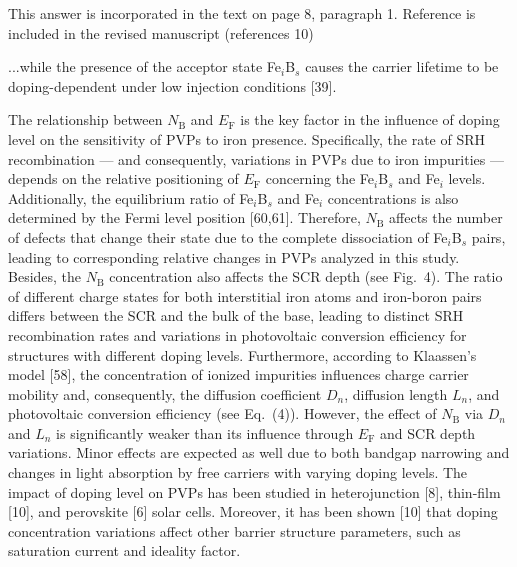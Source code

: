 \documentclass[a4paper,fleqn]{cas-sc}
\begin{document}
This answer is incorporated in the text on page 8, paragraph 1.
Reference  is included in the revised manuscript (references 10)







\begin{mdframed}
...while the presence of the acceptor state Fe$_i$B$_s$ causes the
carrier lifetime to be doping-dependent under low injection conditions [39].

\textcolor[rgb]{1.00,0.07,0.00}{
The relationship between $N_\mathrm{B}$ and $E_\mathrm{F}$ is the key  factor
in the influence of doping level on the sensitivity of PVPs to iron presence.
Specifically, the rate of SRH recombination ---
and consequently, variations in PVPs due to iron impurities ---
depends on the relative positioning of $E_\mathrm{F}$ concerning the Fe$_i$B$_s$ and Fe$_i$ levels.
Additionally, the equilibrium ratio of Fe$_i$B$_s$ and Fe$_i$ concentrations is also determined by the Fermi level position [60,61].
Therefore, $N_\mathrm{B}$ affects the number of defects that change their state due to the complete dissociation of Fe$_i$B$_s$ pairs,
leading to corresponding relative changes in PVPs analyzed in this study.
Besides, the $N_\mathrm{B}$ concentration also affects the SCR depth (see Fig.~4).
The ratio of different charge states for both interstitial iron atoms and iron-boron pairs differs between the SCR and the bulk of the base, leading to distinct SRH recombination rates and variations in photovoltaic conversion efficiency for structures with different doping levels.
Furthermore, according to Klaassen’s model [58],
the concentration of ionized impurities influences charge carrier mobility and, consequently, the diffusion coefficient $D_n$, diffusion length $L_n$,
and photovoltaic conversion efficiency (see Eq.~(4)).
However, the effect of $N_\mathrm{B}$ via $D_n$ and $L_n$ is significantly weaker than its influence through $E_\mathrm{F}$ and SCR depth variations.
Minor effects are expected as well due to both bandgap narrowing and changes in light absorption by free carriers with varying doping levels.
The impact of doping level on PVPs has been studied in heterojunction [8],
thin-film [10],
and perovskite [6] solar cells.
Moreover, it has been shown [10] that
doping concentration variations affect other barrier structure parameters, such as saturation current and ideality factor.
}
\end{mdframed}
\end{document}
